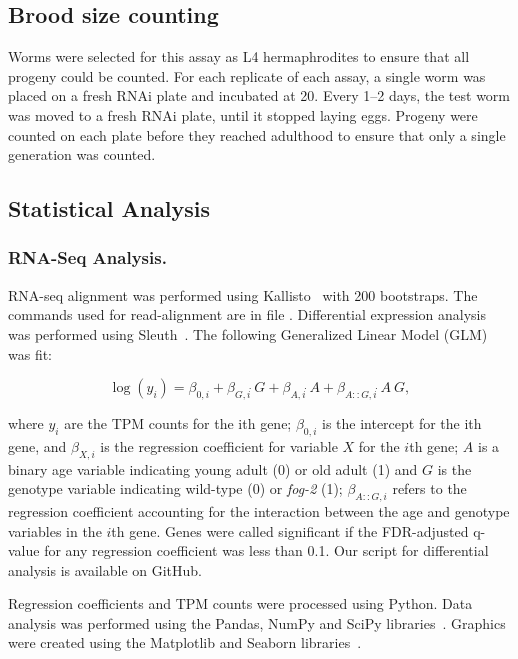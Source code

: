 \documentclass[9pt,twocolumn,twoside]{gsag3jnl}
\newcommand{\fog}{\emph{fog-2}}
\begin{document}
\subsection{Brood size counting}
\label{sb:brood_size}
Worms were selected for this assay as L4 hermaphrodites to ensure that all progeny could be counted. For each replicate of each assay, a single worm was placed on a fresh RNAi plate and incubated at 20\degree. Every 1--2 days, the test worm was moved to a fresh RNAi plate, until it stopped laying eggs. Progeny were counted on each plate before they reached adulthood to ensure that only a single generation was counted.

\subsection{Statistical Analysis}
\label{sb:statistics}
\subsubsection{RNA-Seq Analysis.}
RNA-seq alignment was performed using Kallisto~\citep{} with 200 bootstraps. The commands used for read-alignment are in file %
. Differential expression analysis was performed using Sleuth~\citep{}. The following Generalized Linear Model (GLM) was fit:

\begin{equation}
  \log(y_i) = \beta_{0,i} + \beta_{G,i}\dot~G + \beta_{A,i}\dot~A + \beta_{A::G,i}\dot~A~G,
  \label{eqn:GLM}
\end{equation}

where $y_i$ are the TPM counts for the ith gene; $\beta_{0,i}$ is the intercept for the ith gene, and $\beta_{X,i}$ is the regression coefficient for variable $X$ for the $i$th gene; $A$ is a binary age variable indicating young adult (0) or old adult (1) and $G$ is the genotype variable indicating wild-type (0) or \fog{} (1); $\beta_{A::G, i}$ refers to the regression coefficient accounting for the interaction between the age and genotype variables in the $i$th gene. Genes were called significant if the FDR-adjusted q-value for any regression coefficient was less than 0.1. Our script for differential analysis is available on GitHub.

Regression coefficients and TPM counts were processed using Python. Data analysis was performed using the Pandas, NumPy and SciPy libraries~\citep{}. Graphics were created using the Matplotlib and Seaborn libraries~\citep{}.
\end{document}

